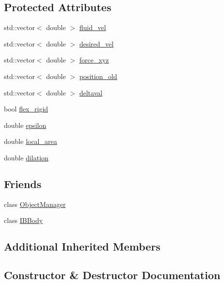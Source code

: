 \subsection*{Protected Attributes}
\begin{DoxyCompactItemize}
\item 
std\+::vector$<$ double $>$ \hyperlink{class_i_b_marker_aa31ccf45de61bfccc60876ac9e98909a}{fluid\+\_\+vel}
\item 
std\+::vector$<$ double $>$ \hyperlink{class_i_b_marker_ad9535b494684533ace9a9523c4df26bf}{desired\+\_\+vel}
\item 
std\+::vector$<$ double $>$ \hyperlink{class_i_b_marker_aa8b8b23e64a8bfc4051b95ebf9ccb767}{force\+\_\+xyz}
\item 
std\+::vector$<$ double $>$ \hyperlink{class_i_b_marker_a6a55fe2293f288ae339036ea4a3bc7df}{position\+\_\+old}
\item 
std\+::vector$<$ double $>$ \hyperlink{class_i_b_marker_a82296e15048c55bd121245d85b076168}{deltaval}
\item 
bool \hyperlink{class_i_b_marker_a826fd907814ce9c6e40bcbdbd359ec7e}{flex\+\_\+rigid}
\item 
double \hyperlink{class_i_b_marker_a8127c61f723299ba0bf04439c1fb1c1e}{epsilon}
\item 
double \hyperlink{class_i_b_marker_aa332dcba1676eae4fbb6d0fa6caca809}{local\+\_\+area}
\item 
double \hyperlink{class_i_b_marker_a5c908a7e52fc0b2dccbaa277f37b7c22}{dilation}
\end{DoxyCompactItemize}
\subsection*{Friends}
\begin{DoxyCompactItemize}
\item 
class \hyperlink{class_i_b_marker_a8b86bdcdb7c54a536293d8632363e114}{Object\+Manager}
\item 
class \hyperlink{class_i_b_marker_a5d93aa5aec680a2b395a71266fe4ac92}{I\+B\+Body}
\end{DoxyCompactItemize}
\subsection*{Additional Inherited Members}


\subsection{Constructor \& Destructor Documentation}
